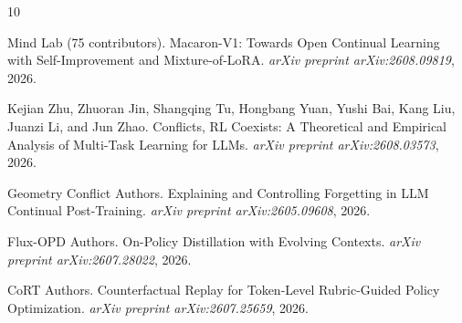 \documentclass[11pt,a4paper]{article}
\begin{document}

\begin{thebibliography}{10}

Mind Lab (75 contributors).
\newblock Macaron-V1: Towards Open Continual Learning with Self-Improvement and Mixture-of-{LoRA}.
\newblock \emph{arXiv preprint arXiv:2608.09819}, 2026.

Kejian Zhu, Zhuoran Jin, Shangqing Tu, Hongbang Yuan, Yushi Bai, Kang Liu, Juanzi Li, and Jun Zhao.
 Conflicts, {RL} Coexists: A Theoretical and Empirical Analysis of Multi-Task Learning for {LLMs}.
\newblock \emph{arXiv preprint arXiv:2608.03573}, 2026.

Geometry Conflict Authors.
\newblock Explaining and Controlling Forgetting in {LLM} Continual Post-Training.
\newblock \emph{arXiv preprint arXiv:2605.09608}, 2026.

Flux-{OPD} Authors.
\newblock On-Policy Distillation with Evolving Contexts.
\newblock \emph{arXiv preprint arXiv:2607.28022}, 2026.

{CoRT} Authors.
\newblock Counterfactual Replay for Token-Level Rubric-Guided Policy Optimization.
\newblock \emph{arXiv preprint arXiv:2607.25659}, 2026.

\end{thebibliography}
\end{document}

